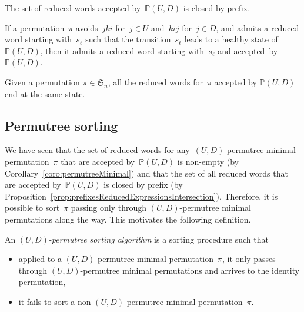 \documentclass[ALCO]{cedram}
\newcommand{\fS}{\mathfrak{S}}
\newcommand{\defn}[1]{\textsl{\color{darkblue} #1}}
\newcommand{\automatonP}{\mathbb{P}}
\begin{document}
\begin{proposition}\label{prop:prefixesReducedExpressionsIntersection}
The set of reduced words accepted by~$\automatonP(U,D)$ is closed by prefix.
\end{proposition}

\begin{proposition}\label{prop:algorithmIntersection}
If a permutation~$\pi$ avoids~$jki$ for~$j \in U$ and~$kij$ for~$j \in D$, and admits a reduced word starting with~$s_\ell$ such that the transition~$s_\ell$ leads to a healthy state of~$\automatonP(U,D)$, then it admits a reduced word starting with~$s_\ell$ and accepted~by~$\automatonP(U,D)$.
\end{proposition}

\begin{proposition}\label{prop:sameStateAcceptedReducedExpressionsIntersection}
Given a permutation $\pi \in \fS_n$, all the reduced words for~$\pi$ accepted by $\automatonP(U,D)$ end at the same state.
\end{proposition}

\subsection{Permutree sorting}\label{subsec:permutreeSorting}

We have seen that the set of reduced words for any~$(U,D)$-permutree minimal permutation~$\pi$ that are accepted by~$\automatonP(U,D)$ is non-empty (by Corollary~\ref{coro:permutreeMinimal}) and that the set of all reduced words that are accepted by~$\automatonP(U,D)$ is closed by prefix (by Proposition~\ref{prop:prefixesReducedExpressionsIntersection}).
Therefore, it is possible to sort~$\pi$ passing only through $(U,D)$-permutree minimal permutations along the way.
This motivates the following definition.

\begin{definition}
An \defn{$(U,D)$-permutree sorting algorithm} is a sorting procedure such that
\begin{itemize}
\item applied to a $(U,D)$-permutree minimal permutation~$\pi$, it only passes through $(U,D)$-permutree minimal permutations and arrives to the identity permutation, 
\item it fails to sort a non $(U,D)$-permutree minimal permutation~$\pi$.
\end{itemize}
\end{definition}
\end{document}
